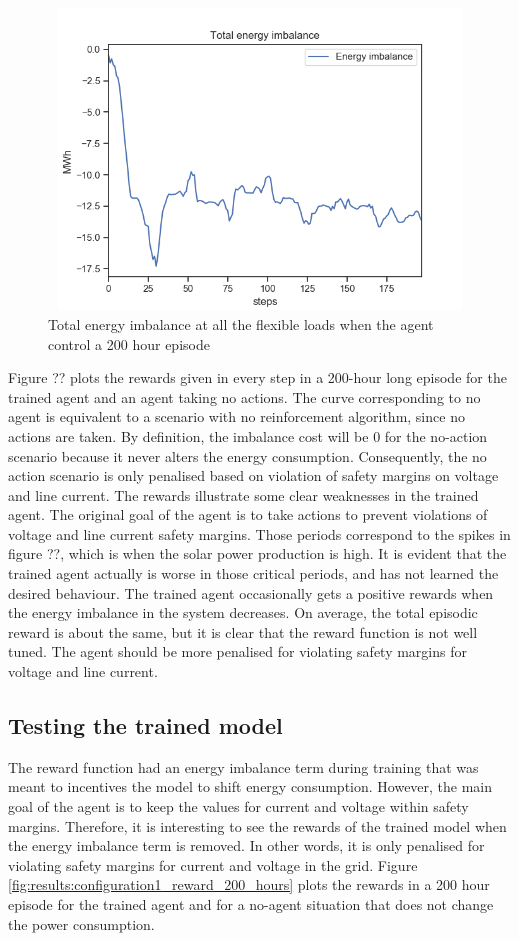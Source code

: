 \documentclass[class=book, crop=false]{standalone}
\begin{document}
\begin{figure}[ht]
    \center
\includegraphics[height=8cm, width=12cm]{figures/configuration1_imbalance.png}
    \caption[size = 9]{Total energy imbalance at all the flexible loads when the agent control a 200 hour episode}
    \label{fig:results:configuration1_energy_imbalance}
\end{figure}
Figure ?? plots the rewards given in every step in a 200-hour long episode for the trained agent and an agent taking no actions. The curve corresponding to no agent is equivalent to a scenario with no reinforcement algorithm, since no actions are taken. By definition, the imbalance cost will be 0 for the no-action scenario because it never alters the energy consumption. Consequently, the no action scenario is only penalised based on violation of safety margins on voltage and line current. The rewards illustrate some clear weaknesses in the trained agent. The original goal of the agent is to take actions to prevent violations of voltage and line current safety margins. Those periods correspond to the spikes in figure ??, which is when the solar power production is high. It is evident that the trained agent actually is worse in those critical periods, and has not learned the desired behaviour. The trained agent occasionally gets a positive rewards when the energy imbalance in the system decreases. On average, the total episodic reward is about the same, but it is clear that the reward function is not well tuned. The agent should be more penalised for violating safety margins for voltage and line current.

\subsection{Testing the trained model}
The reward function had an energy imbalance term during training that was meant to incentives the model to shift energy consumption. However, the main goal of the agent is to keep the values for current and voltage within safety margins. Therefore, it is interesting to see the rewards of the trained model when the energy imbalance term is removed. In other words, it is only penalised for violating safety margins for current and voltage in the grid. Figure \ref{fig:results:configuration1_reward_200_hours} plots the rewards in a 200 hour episode for the trained agent and for a no-agent situation that does not change the power consumption.
\end{document}
